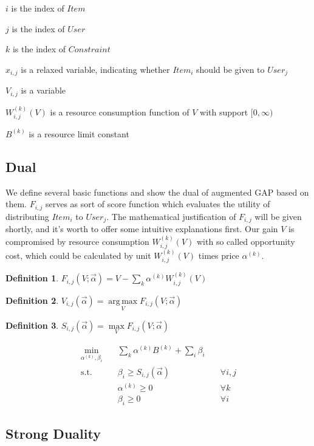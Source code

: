 \documentclass{article}
\theoremstyle{definition}
\newtheorem{definition}{Definition}[section]
\DeclareMathOperator*{\argmax}{arg\,max}
\newcommand{\sumi}{\sum\limits_i}
\newcommand{\sumk}{\sum\limits_k}
\newcommand{\sx}{x_{i,j}}
\newcommand{\sV}{V_{i,j}}
\newcommand{\sW}{W_{i,j}^{(k)}}
\newcommand{\sB}{B^{(k)}}
\newcommand{\salpha}{\alpha^{(k)}}
\newcommand{\sbeta}{\beta_i}
\newcommand{\sF}{F_{i,j}}
\newcommand{\sS}{S_{i,j}}
\newcommand{\valpha}{\vec{\alpha}}
\newcommand{\scoreconstraint}{\sbeta \ge \sS(\vec{\alpha})}
\begin{document}
\begin{CJK}{UTF8}{gbsn}
$i$ is the index of $Item$

$j$ is the index of $User$

$k$ is the index of $Constraint$

$\sx$ is a relaxed variable, indicating whether $Item_i$ should be given to $User_j$

$\sV$ is a variable

$\sW(V)$ is a resource consumption function of $V$ with support $[0, \infty)$

$\sB$ is a resource limit constant

\subsection{Dual}

We define several basic functions and show the dual of augmented GAP based on them.
$\sF$ serves as sort of score function which evaluates the utility of distributing $Item_i$ to $User_j$.
The mathematical justification of $\sF$ will be given shortly, and it's worth to offer some intuitive explanations first.
Our gain $V$ is compromised by resource consumption $\sW(V)$ with so called opportunity cost, which could be calculated by unit $\sW(V)$ times price $\salpha$.

\begin{definition}
$\sF(V; \valpha) = V - \sumk \salpha \sW(V)$
\end{definition}

\begin{definition}
$\sV(\valpha) = \argmax\limits_V \sF(V; \valpha)$
\end{definition}

\begin{definition}
$\sS(\valpha) = \max\limits_V \sF(V; \valpha)$
\end{definition}

\begin{alignat}{2}
    \min\limits_{\salpha, \sbeta} \quad & \sumk \salpha \sB + \sumi \sbeta \quad   & {} \\
    \mbox{s.t.} \quad                   & \scoreconstraint \quad                   & \forall i,j \\
    \quad                               & \salpha \ge 0 \quad                      & \forall k \\
    \quad                               & \sbeta \ge 0 \quad                       & \forall i
\end{alignat}

\subsection{Strong Duality}


\end{CJK}
\end{document}
